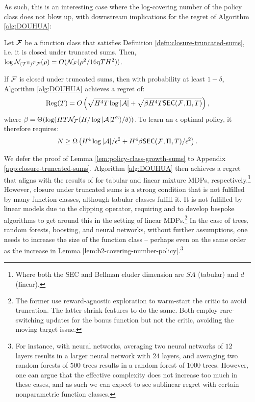 As such, this is an interesting case where the log-covering number of the policy class does not blow up, with downstream implications for the regret of Algorithm \ref{alg:DOUHUA}:
\begin{lem}
    Let ${\mathcal{F}}$ be a function class that satisfies Definition \ref{defn:closure-truncated-sums}, i.e. it is closed under truncated sums. Then, $\log {\mathcal{N}}_{({\mathcal{T}}^\Pi)^{T}{\mathcal{F}}}(\rho) = O({\mathcal{N}}_{{\mathcal{F}}}(\rho^2/16\eta TH^2))$.
    \label{lem:policy-class-growth-sums}
\end{lem}

\begin{cor}
    If ${\mathcal{F}}$ is closed under truncated sums, then with probability at least $1-\delta$, Algorithm \ref{alg:DOUHUA} achieves a regret of:
$$\mathrm{Reg}(T)
    = O\left(\sqrt{H^4 T \log|{\mathcal{A}}|}  + \sqrt{\beta H^4 T\mathsf{SEC}({\mathcal{F}}, \Pi, T)}\right),$$
where $\beta = \Theta(\log (HT \mathcal{N}_{{\mathcal{F}}}(H/\log|{\mathcal{A}}| T^2) / \delta))$. To learn an $\epsilon$-optimal policy, it therefore requires:
$$N \geq \Omega\left(H^4 \log|{\mathcal{A}}|/\epsilon^2 + H^4 \beta \mathsf{SEC}({\mathcal{F}}, \Pi, T)/\epsilon^2\right).$$
\label{cor:good-case-douhua}
\end{cor}

We defer the proof of Lemma \ref{lem:policy-class-growth-sums} to Appendix \ref{app:closure-truncated-sums}. Algorithm \ref{alg:DOUHUA} then achieves a regret that aligns with the results of \citet{efroni2020optimisticpolicyoptimizationbandit, cai2020provably} for tabular and linear mixture MDPs, respectively.\footnote{Where both the SEC and Bellman eluder dimension are $SA$ (tabular) and $d$ (linear).}
However, closure under truncated sums is a strong condition that is not fulfilled by many function classes, although tabular classes fulfill it. It is not fulfilled by linear models due to the clipping operator, requiring \citet{sherman2023rate} and \citet{cassel2024warm} to develop bespoke algorithms to get around this in the setting of linear MDPs.\footnote{The former use reward-agnostic exploration to warm-start the critic to avoid truncation. The latter shrink features to do the same. Both employ rare-switching updates for the bonus function but not the critic, avoiding the moving target issue.} In the case of trees, random forests, boosting, and neural networks, without further assumptions, one needs to increase the size of the function class -- perhaps even on the same order as the increase in Lemma \ref{lem:b2-covering-number-policy}.\footnote{For instance, with neural networks, averaging two neural networks of $12$ layers results in a larger neural network with $24$ layers, and averaging two random forests of $500$ trees results in a random forest of $1000$ trees. However, one can argue that the effective complexity does not increase too much in these cases, and as such we can expect to see sublinear regret with certain nonparametric function classes.}

